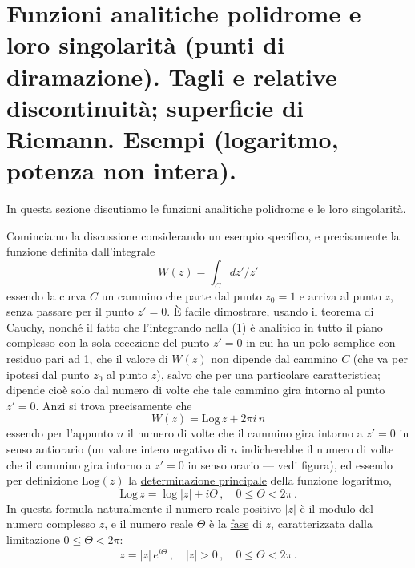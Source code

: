 \documentclass[11pt, a4paper]{book}
\numberwithin{equation}{section}
\begin{document}
\section[Funzioni analitiche polidrome e loro singolarità. Tagli e relative discontinuità; superficie di Riemann. Esempi]{Funzioni analitiche polidrome e loro singolarità (punti di diramazione). Tagli e relative discontinuità; superficie di Riemann. Esempi (logaritmo, potenza non intera).}

In questa sezione discutiamo le funzioni analitiche polidrome e le loro singolarità.

Cominciamo la discussione considerando un esempio specifico, e precisamente la funzione definita dall'integrale
\begin{equation}
W(z) = \int_C dz' \big/ z' \tag{1}
\end{equation}
essendo la curva $C$ un cammino che parte dal punto $z_0 = 1$ e arriva al punto $z$, senza passare per il punto $z' = 0$. È facile dimostrare, usando il teorema di Cauchy, nonché il fatto che l'integrando nella (1) è analitico in tutto il piano complesso con la sola eccezione del punto $z'=0$ in cui ha un polo semplice con residuo pari ad 1, che il valore di $W(z)$ non dipende dal cammino $C$ (che va per ipotesi dal punto $z_0$ al punto $z$), salvo che per una particolare caratteristica; dipende cioè solo dal numero di volte che tale cammino gira intorno al punto $z'=0$. Anzi si trova precisamente che
\begin{equation}
W(z) = \mathrm{Log}\,z + 2\pi i\,n \tag{2}
\end{equation}
essendo per l'appunto $n$ il numero di volte che il cammino gira intorno a $z'=0$ in senso antiorario (un valore intero negativo di $n$ indicherebbe il numero di volte che il cammino gira intorno a $z'=0$ in senso orario — vedi figura), ed essendo per definizione $\mathrm{Log}(z)$ la \uline{determinazione principale} della funzione logaritmo,
\begin{equation}
\mathrm{Log}\,z = \log|z| + i\Theta\,, \quad 0 \leq \Theta < 2\pi\,. \tag{3}
\end{equation}
In questa formula naturalmente il numero reale positivo $|z|$ è il \uline{modulo} del numero complesso $z$, e il numero reale $\Theta$ è la \uline{fase} di $z$, caratterizzata dalla limitazione $0 \leq \Theta < 2\pi$:
\begin{equation}
z = |z|\,e^{i\Theta}\,, \quad |z|>0\,, \quad 0 \leq \Theta < 2\pi\,. \tag{4}
\end{equation}
\end{document}
